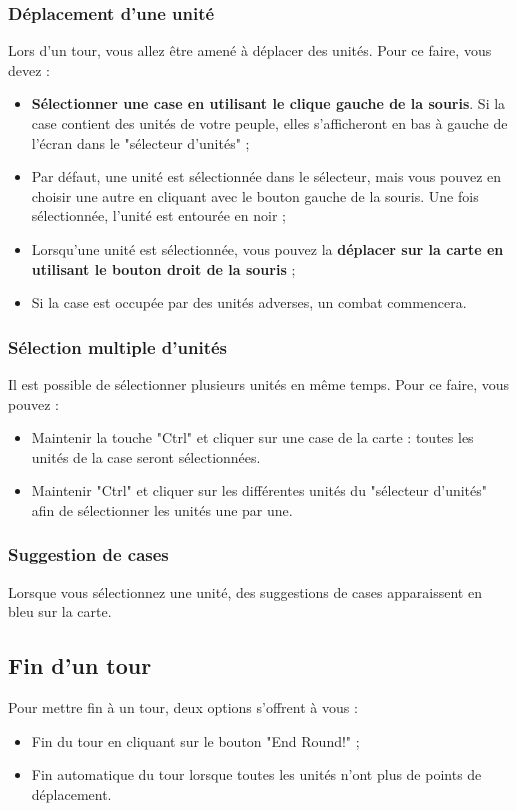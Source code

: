 \documentclass[a4paper,12pt]{article}
\begin{document}
\subsubsection{Déplacement d'une unité}
Lors d'un tour, vous allez être amené à déplacer des unités. Pour ce faire, vous devez :
\begin{itemize}
\item \textbf{Sélectionner une case en utilisant le clique gauche de la souris}. Si la case contient des unités de votre peuple, elles s'afficheront en bas à gauche de l'écran dans le "sélecteur d'unités" ;
\item Par défaut, une unité est sélectionnée dans le sélecteur, mais vous pouvez en choisir une autre en cliquant avec le bouton gauche de la souris. Une fois sélectionnée, l'unité est entourée en noir ;
\item Lorsqu'une unité est sélectionnée, vous pouvez la \textbf{déplacer sur la carte en utilisant le bouton droit de la souris} ;
\item Si la case est occupée par des unités adverses, un combat commencera.
\end{itemize}

\subsubsection{Sélection multiple d'unités}
Il est possible de sélectionner plusieurs unités en même temps. Pour ce faire, vous pouvez :
\begin{itemize}
\item Maintenir la touche "Ctrl" et cliquer sur une case de la carte : toutes les unités de la case seront sélectionnées.
\item Maintenir "Ctrl" et cliquer sur les différentes unités du "sélecteur d'unités" afin de sélectionner les unités une par une.
\end{itemize}

\subsubsection{Suggestion de cases}
Lorsque vous sélectionnez une unité, des suggestions de cases apparaissent en bleu sur la carte.

\subsection{Fin d'un tour}
Pour mettre fin à un tour, deux options s'offrent à vous :
\begin{itemize}
\item Fin du tour en cliquant sur le bouton "End Round!" ;
\item Fin automatique du tour lorsque toutes les unités n'ont plus de points de déplacement.
\end{itemize}
\end{document}
